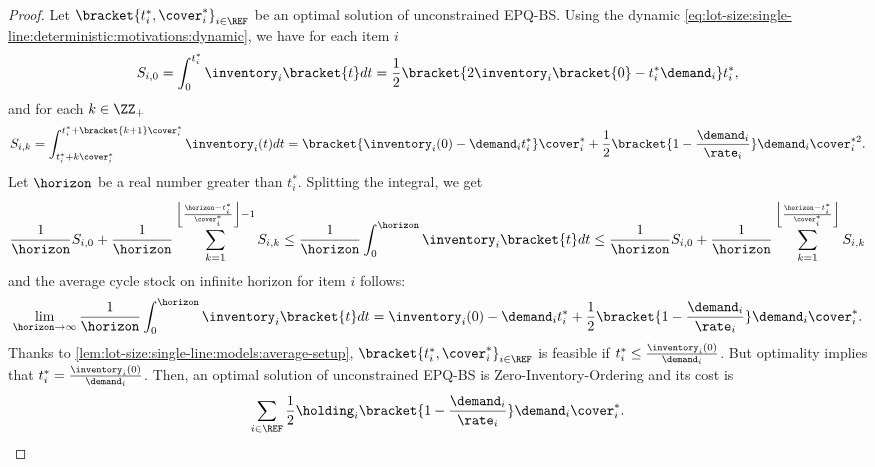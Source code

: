 \begin{proof}
Let $\bracket{t_i^*,\cover_i^*}_{i\in\REF}$ be an optimal solution of unconstrained EPQ-BS.
Using the dynamic \eqref{eq:lot-size:single-line:deterministic:motivations:dynamic}, we have for each item $i$
\begin{equation}
  S_{i,0}
  =
  \int_0^{t_i^*}\inventory_i\bracket{t}dt
  = \frac{1}{2}\bracket{2\inventory_i\bracket{0}-t_i^*\demand_i}t_i^*,
\end{equation}
and for each $k\in\ZZ_+$
\begin{equation}
  S_{i,k}
  =
  \int_{t_i^*+k\cover_i^*}^{t_i^*+\bracket{k+1}\cover_i^*}\inventory_i(t)dt
  =
  \bracket{\inventory_i(0)-\demand_i t_i^*}\cover_i^*
  + \frac{1}{2}\bracket{1-\frac{\demand_i}{\rate_i}}\demand_i\cover_i^{*2}.
\end{equation}
Let $\horizon$ be a real number greater than $t_i^*$.
Splitting the integral, we get
\begin{equation}
  \frac{1}{\horizon} S_{i,0}
  + \frac{1}{\horizon} \sum_{k=1}^{\left\lfloor\frac{\horizon-t_i^*}{\cover_i^*}\right\rfloor-1} S_{i,k}
  \le
  \frac{1}{\horizon} \int_0^{\horizon}\inventory_i\bracket{t}dt
  \le
  \frac{1}{\horizon} S_{i,0}
  + \frac{1}{\horizon} \sum_{k=1}^{\left\lfloor\frac{\horizon-t_i^*}{\cover_i^*}\right\rfloor} S_{i,k}
\end{equation}
and the average cycle stock on infinite horizon for item $i$ follows:
\begin{equation}
  \lim_{\horizon\rightarrow\infty} \frac{1}{\horizon} \int_0^{\horizon}\inventory_i\bracket{t}dt
  =
  \inventory_i(0)-\demand_i t_i^*
  + \frac{1}{2}\bracket{1-\frac{\demand_i}{\rate_i}}\demand_i\cover_i^*.
\end{equation}
Thanks to \cref{lem:lot-size:single-line:models:average-setup}, $\bracket{t_i^*,\cover_i^*}_{i\in\REF}$ is feasible if $t_i^*\le\frac{\inventory_i(0)}{\demand_i}$. But optimality implies that $t_i^*=\frac{\inventory_i(0)}{\demand_i}$.
Then, an optimal solution of unconstrained EPQ-BS is Zero-Inventory-Ordering and its cost is
\begin{equation}
  \sum_{i\in\REF}\frac{1}{2}\holding_i\bracket{1-\frac{\demand_i}{\rate_i}}\demand_i\cover_i^*.
\end{equation}
\end{proof}





